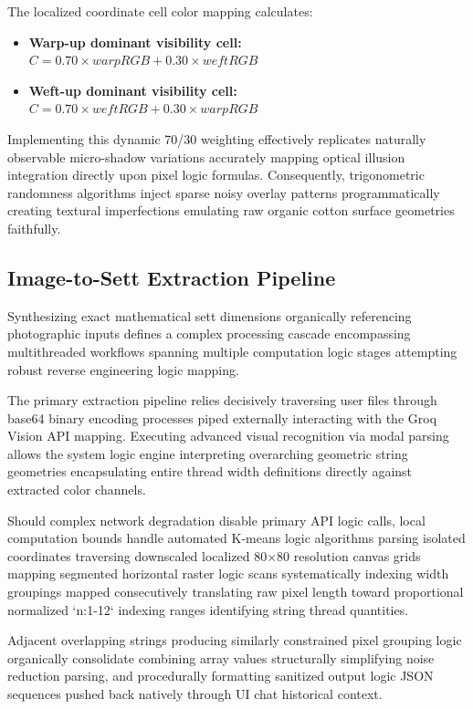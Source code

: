 The localized coordinate cell color mapping calculates:
\begin{itemize}
    \item \textbf{Warp-up dominant visibility cell:} $C = 0.70 \times warpRGB + 0.30 \times weftRGB$
    \item \textbf{Weft-up dominant visibility cell:} $C = 0.70 \times weftRGB + 0.30 \times warpRGB$
\end{itemize}

Implementing this dynamic 70/30 weighting effectively replicates naturally observable micro-shadow variations accurately mapping optical illusion integration directly upon pixel logic formulas. Consequently, trigonometric randomness algorithms inject sparse noisy overlay patterns programmatically creating textural imperfections emulating raw organic cotton surface geometries faithfully.

\subsection{Image-to-Sett Extraction Pipeline}
Synthesizing exact mathematical sett dimensions organically referencing photographic inputs defines a complex processing cascade encompassing multithreaded workflows spanning multiple computation logic stages attempting robust reverse engineering logic mapping.

The primary extraction pipeline relies decisively traversing user files through base64 binary encoding processes piped externally interacting with the Groq Vision API mapping. Executing advanced visual recognition via modal parsing allows the system logic engine interpreting overarching geometric string geometries encapsulating entire thread width definitions directly against extracted color channels.

Should complex network degradation disable primary API logic calls, local computation bounds handle automated K-means logic algorithms parsing isolated coordinates traversing downscaled localized 80×80 resolution canvas grids mapping segmented horizontal raster logic scans systematically indexing width groupings mapped consecutively translating raw pixel length toward proportional normalized `n:1-12` indexing ranges identifying string thread quantities.

Adjacent overlapping strings producing similarly constrained pixel grouping logic organically consolidate combining array values structurally simplifying noise reduction parsing, and procedurally formatting sanitized output logic JSON sequences pushed back natively through UI chat historical context.

